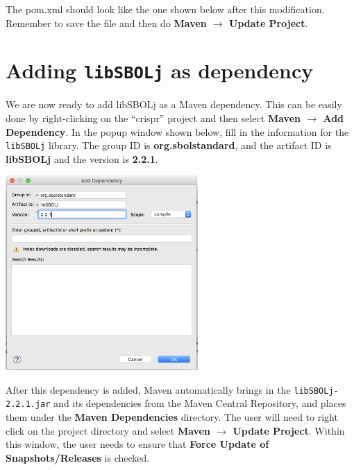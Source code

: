 The pom.xml should look like the one shown below after this modification. Remember to save the file and then do {\bf Maven $\rightarrow$  Update Project}.

\begin{minipage}{\textwidth} 

\end{minipage}

\section*{Adding {\tt libSBOLj} as dependency}
We are now ready to add libSBOLj as a Maven dependency. This can be easily done by right-clicking on the ``crispr'' project and then select {\bf Maven $\rightarrow$ Add Dependency}.
In the popup window shown below, fill in the information for the {\tt libSBOLj} library. The group ID is {\bf org.sbolstandard}, and the artifact ID is {\bf libSBOLj} and the version is {\bf 2.2.1}. 
\begin{center}
  \includegraphics[width=0.55\textwidth]{figures/addMavenDependency2}
\end{center}

After this dependency is added, Maven automatically brings in the  {\tt libSBOLj-2.2.1.jar} and its dependencies from the Maven Central Repository, and places them under the {\bf Maven Dependencies} directory. The user will need to right click on the project directory and select {\bf Maven $\rightarrow$ Update Project}. Within this window, the user needs to ensure that {\bf Force Update of Snapshots/Releases} is checked. 


